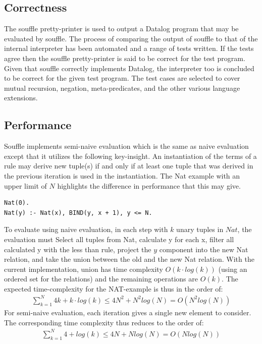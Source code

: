 \subsection{Correctness}
The souffle pretty-printer is used to output a Datalog program that may be evaluated by souffle. The process of comparing the output of souffle to that of the internal interpreter has been automated and a range of tests written. If the tests agree then the souffle pretty-printer is said to be correct for the test program. Given that souffle correctly implements Datalog, the interpreter too is concluded to be correct for the given test program. The test cases are selected to cover mutual recursion, negation, meta-predicates, and the other various language extensions.

\subsection{Performance}
Souffle implements semi-naive evaluation\cite{Green:2013:DRQ:2688167.2688168} which is the same as naive evaluation except that it utilizes the following key-insight. An instantiation of the terms of a rule may derive new tuple(s) if and only if at least one tuple that was derived in the previous iteration is used in the instantiation.
The Nat example with an upper limit of $N$ highlights the difference in performance that this may give.
\begin{verbatim}
Nat(0).
Nat(y) :- Nat(x), BIND(y, x + 1), y <= N.
\end{verbatim}
\noindent
To evaluate using naive evaluation, in each step with $k$ unary tuples in $Nat$, the evaluation must Select all tuples from Nat, calculate y for each x, filter all calculated y with the less than rule, project the $y$ component into the new Nat relation, and take the union between the old and the new Nat relation. With the current implementation, union has time complexity $O(k \cdot log(k))$ (using an ordered set for the relations) and the remaining operations are $O(k)$. The expected time-complexity for the NAT-example is thus in the order of:
\begin{align*}
\sum_{k = 1}^{N} 4 k + k \cdot log (k) \leq 4 N^2 + N^2 log(N) = O(N^2 log(N))
\end{align*}
For semi-naive evaluation, each iteration gives a single new element to consider. The corresponding time complexity thus reduces to the order of:
\begin{align*}
	\sum_{k = 1}^{N} 4 + log (k) \leq 4N + N log(N) = O(N log(N))
\end{align*}

